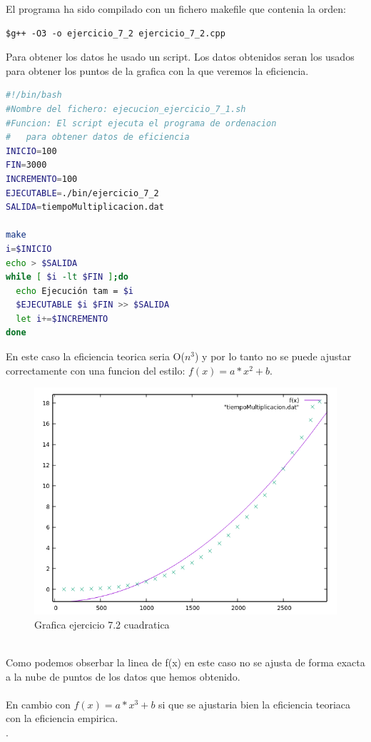 \documentclass[12pt,a4psprt]{article}
\begin{document}
El programa ha sido compilado con un fichero makefile que contenia la orden:
\begin{verbatim}
$g++ -O3 -o ejercicio_7_2 ejercicio_7_2.cpp
\end{verbatim}
\pagebreak
Para obtener los datos he usado un script. Los datos obtenidos seran los usados para obtener los puntos de la grafica con la que veremos la eficiencia.
\begin{lstlisting}[language=bash]
#!/bin/bash
#Nombre del fichero: ejecucion_ejercicio_7_1.sh
#Funcion: El script ejecuta el programa de ordenacion 
#	para obtener datos de eficiencia
INICIO=100
FIN=3000
INCREMENTO=100
EJECUTABLE=./bin/ejercicio_7_2
SALIDA=tiempoMultiplicacion.dat

make
i=$INICIO
echo > $SALIDA
while [ $i -lt $FIN ];do
  echo Ejecución tam = $i
  $EJECUTABLE $i $FIN >> $SALIDA
  let i+=$INCREMENTO
done

\end{lstlisting}
\pagebreak
En este caso la eficiencia teorica seria O($n^{3}$) y por lo tanto no se puede ajustar correctamente con una funcion del estilo: \textbf{$f(x)=a*x^{2}+b $}.
\begin{figure}[h]
\begin{center}
	\includegraphics[scale=1]{image/grafica_7_2_cuadratica.png}
\end{center}
\caption{Grafica ejercicio 7.2 cuadratica}
\end{figure}
\\Como podemos obserbar la linea de f(x) en este caso no se ajusta de forma exacta a la nube de puntos de los datos que hemos obtenido.\\
\pagebreak
\\En cambio con \textbf{$f(x)=a*x^{3}+b $} si que se ajustaria bien la eficiencia teoriaca con la eficiencia empirica.\\.
\end{document}

